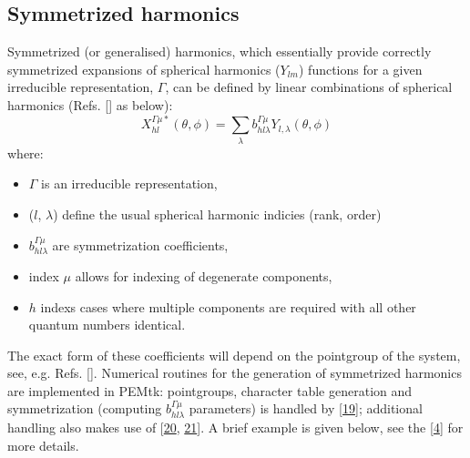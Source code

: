 \documentclass[letterpaper,10pt,english]{jupyterBook}
\begin{document}
\subsection{Symmetrized harmonics}
\label{\detokenize{part1/theory_101122:symmetrized-harmonics}}\label{\detokenize{part1/theory_101122:sec-theory-sym-harm-into}}
\sphinxAtStartPar
Symmetrized (or generalised) harmonics, which essentially provide correctly symmetrized expansions of spherical harmonics (\(Y_{lm}\)) functions for a given irreducible representation, \(\Gamma\), can be defined by linear combinations of spherical harmonics (Refs. {[}{]} as below):
\label{equation:part1/theory_101122:7a5514df-b0cf-4f94-a065-96e73a866519}\begin{equation}
X_{hl}^{\Gamma\mu*}(\theta,\phi)=\sum_{\lambda}b_{hl\lambda}^{\Gamma\mu}Y_{l,\lambda}(\theta,\phi)\label{eq:symm-harmonics}
\end{equation}
\sphinxAtStartPar
where:
\begin{itemize}
\item {} 
\sphinxAtStartPar
\(\Gamma\) is an irreducible representation,

\item {} 
\sphinxAtStartPar
(\(l\), \(\lambda\)) define the usual spherical harmonic indicies (rank, order)

\item {} 
\sphinxAtStartPar
\(b_{hl\lambda}^{\Gamma\mu}\) are symmetrization coefficients,

\item {} 
\sphinxAtStartPar
index \(\mu\) allows for indexing of degenerate components,

\item {} 
\sphinxAtStartPar
\(h\) indexs cases where multiple components are required with all other quantum numbers identical.

\end{itemize}

\sphinxAtStartPar
The exact form of these coefficients will depend on the point\sphinxhyphen{}group of the system, see, e.g. Refs. {[}{]}. Numerical routines for the generation of symmetrized harmonics are implemented in PEMtk: point\sphinxhyphen{}groups, character table generation and symmetrization (computing \(b_{hl\lambda}^{\Gamma\mu}\) parameters) is handled by  {[}\hyperlink{cite.backmatter/bibliography:id62}{19}{]}; additional handling also makes use of  {[}\hyperlink{cite.backmatter/bibliography:id70}{20}, \hyperlink{cite.backmatter/bibliography:id71}{21}{]}. A brief example is given below, see the  {[}\hyperlink{cite.backmatter/bibliography:id56}{4}{]} for more details.
\end{document}
